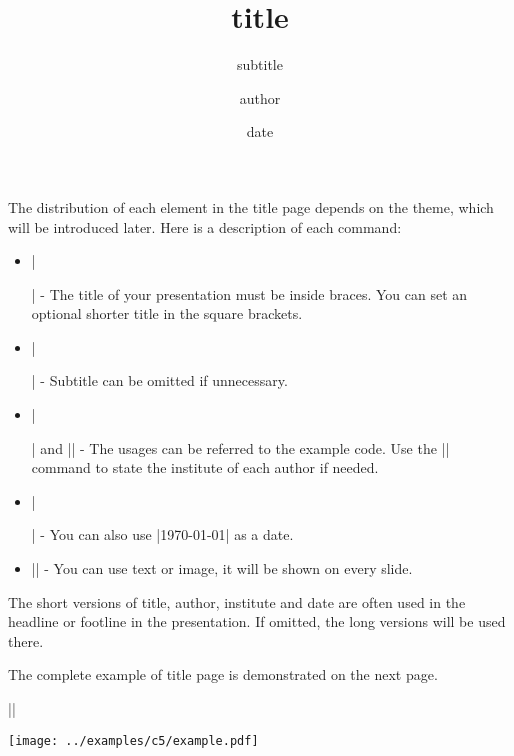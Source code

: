 \begin{fragileframe}

The distribution of each element in the title page depends on the theme, which will be introduced later. Here is a description of each command:

\begin{itemize}
\item \LC|\title[short title]{title}| - The title of your presentation must be inside braces. You can set an optional shorter title in the square brackets.
\item \LC|\subtitle{subtitle}| - Subtitle can be omitted if unnecessary.
\item \LC|\author[short author]{author}| and \LC|| - The usages can be referred to the example code. Use the \LC|\inst| command to state the institute of each author if needed.
\item \LC|\date[short date]{date}| - You can also use \LC|\today| as a date.
\item \LC|| - You can use text or image, it will be shown on every slide.
\end{itemize} \medskip

The short versions of title, author, institute and date are often used in the headline or footline in the presentation. If omitted, the long versions will be used there. \medskip

The complete example of title page is demonstrated on the next page.

\end{fragileframe}

\begin{fragileframe}
\begin{center}
\LC|\frame{\titlepage}|\medskip

\texttt{[image: ../examples/c5/example.pdf]}
\end{center}
\end{fragileframe}

